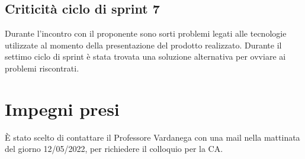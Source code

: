 \documentclass[a4paper, 12pt]{article}
\begin{document}
\subsection{Criticità ciclo di sprint 7}
Durante l'incontro con il proponente sono sorti problemi legati alle tecnologie utilizzate al momento della presentazione del prodotto realizzato. Durante il settimo ciclo di sprint è stata trovata una soluzione alternativa per ovviare ai problemi riscontrati.

\section{Impegni presi}
È stato scelto di contattare il Professore Vardanega con una mail nella mattinata del giorno 12/05/2022, per richiedere il colloquio per la CA.
\end{document}
